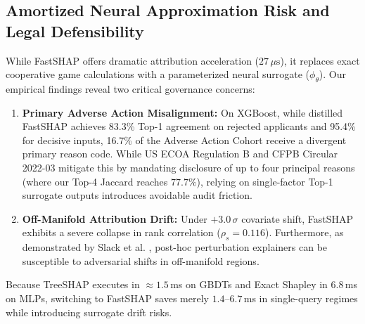 \documentclass[conference]{IEEEtran}
\begin{document}
\subsection{Amortized Neural Approximation Risk and Legal Defensibility}
While FastSHAP offers dramatic attribution acceleration ($27\,\mu\text{s}$), it replaces exact cooperative game calculations with a parameterized neural surrogate ($\phi_\theta$). Our empirical findings reveal two critical governance concerns:
\begin{enumerate}
    \item \textbf{Primary Adverse Action Misalignment:} On XGBoost, while distilled FastSHAP achieves 83.3\% Top-1 agreement on rejected applicants and 95.4\% for decisive inputs, 16.7\% of the Adverse Action Cohort receive a divergent primary reason code. While US ECOA Regulation B and CFPB Circular 2022-03 mitigate this by mandating disclosure of up to four principal reasons (where our Top-4 Jaccard reaches $77.7\%$), relying on single-factor Top-1 surrogate outputs introduces avoidable audit friction.
    \item \textbf{Off-Manifold Attribution Drift:} Under $+3.0\,\sigma$ covariate shift, FastSHAP exhibits a severe collapse in rank correlation ($\rho_s = 0.116$). Furthermore, as demonstrated by Slack et al. \cite{slack2020fooling}, post-hoc perturbation explainers can be susceptible to adversarial shifts in off-manifold regions.
\end{enumerate}
Because TreeSHAP executes in $\approx 1.5$\,ms on GBDTs and Exact Shapley in $6.8$\,ms on MLPs, switching to FastSHAP saves merely $1.4$--$6.7$\,ms in single-query regimes while introducing surrogate drift risks.
\end{document}
